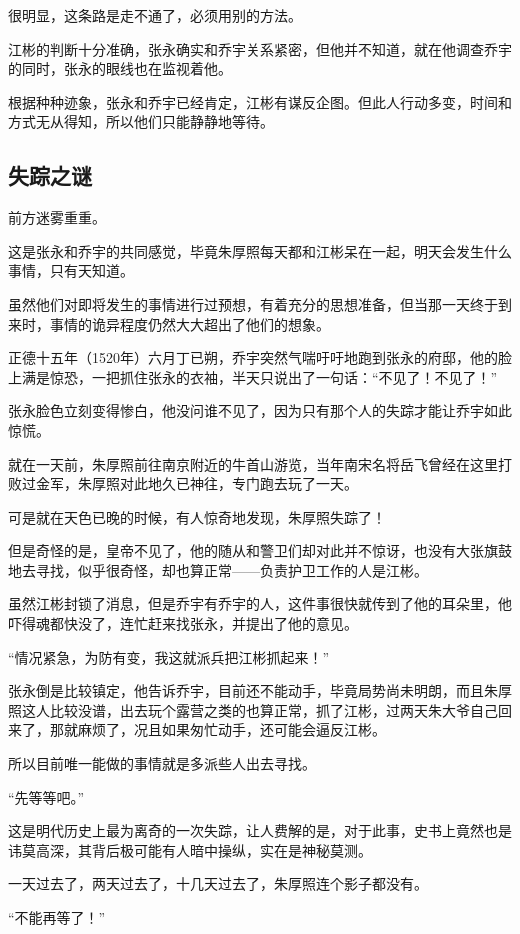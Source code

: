 \begin{multicols}{\theparacolNo}
		很明显，这条路是走不通了，必须用别的方法。

		江彬的判断十分准确，张永确实和乔宇关系紧密，但他并不知道，就在他调查乔宇的同时，张永的眼线也在监视着他。

		根据种种迹象，张永和乔宇已经肯定，江彬有谋反企图。但此人行动多变，时间和方式无从得知，所以他们只能静静地等待。

		\subsection{失踪之谜}
		前方迷雾重重。

		这是张永和乔宇的共同感觉，毕竟朱厚照每天都和江彬呆在一起，明天会发生什么事情，只有天知道。

		虽然他们对即将发生的事情进行过预想，有着充分的思想准备，但当那一天终于到来时，事情的诡异程度仍然大大超出了他们的想象。

		正德十五年（1520年）六月丁已朔，乔宇突然气喘吁吁地跑到张永的府邸，他的脸上满是惊恐，一把抓住张永的衣袖，半天只说出了一句话：“不见了！不见了！”

		张永脸色立刻变得惨白，他没问谁不见了，因为只有那个人的失踪才能让乔宇如此惊慌。

		就在一天前，朱厚照前往南京附近的牛首山游览，当年南宋名将岳飞曾经在这里打败过金军，朱厚照对此地久已神往，专门跑去玩了一天。

		可是就在天色已晚的时候，有人惊奇地发现，朱厚照失踪了！

		但是奇怪的是，皇帝不见了，他的随从和警卫们却对此并不惊讶，也没有大张旗鼓地去寻找，似乎很奇怪，却也算正常——负责护卫工作的人是江彬。

		虽然江彬封锁了消息，但是乔宇有乔宇的人，这件事很快就传到了他的耳朵里，他吓得魂都快没了，连忙赶来找张永，并提出了他的意见。

		“情况紧急，为防有变，我这就派兵把江彬抓起来！”

		张永倒是比较镇定，他告诉乔宇，目前还不能动手，毕竟局势尚未明朗，而且朱厚照这人比较没谱，出去玩个露营之类的也算正常，抓了江彬，过两天朱大爷自己回来了，那就麻烦了，况且如果匆忙动手，还可能会逼反江彬。

		所以目前唯一能做的事情就是多派些人出去寻找。

		“先等等吧。”

		这是明代历史上最为离奇的一次失踪，让人费解的是，对于此事，史书上竟然也是讳莫高深，其背后极可能有人暗中操纵，实在是神秘莫测。

		一天过去了，两天过去了，十几天过去了，朱厚照连个影子都没有。

		“不能再等了！”


\end{multicols}
